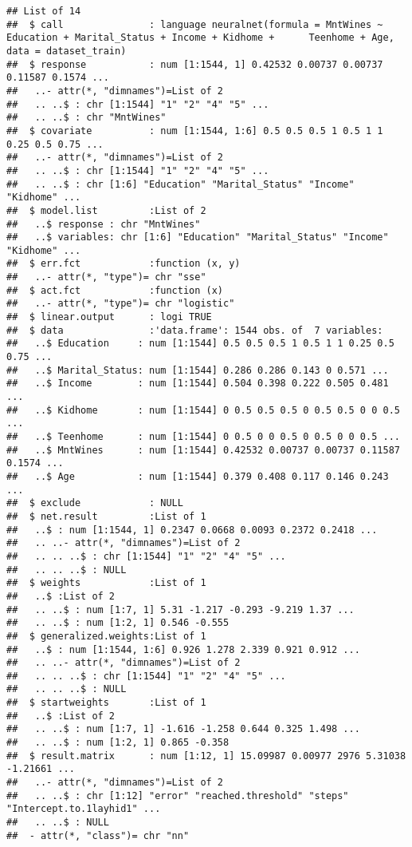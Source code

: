 \documentclass[Iberoamerican Journal of Industrial
Engineering,article,submit,moreauthors,pdftex]{Definitions/mdpi}
\begin{document}
\begin{verbatim}
## List of 14
##  $ call               : language neuralnet(formula = MntWines ~ Education + Marital_Status + Income + Kidhome +      Teenhome + Age, data = dataset_train)
##  $ response           : num [1:1544, 1] 0.42532 0.00737 0.00737 0.11587 0.1574 ...
##   ..- attr(*, "dimnames")=List of 2
##   .. ..$ : chr [1:1544] "1" "2" "4" "5" ...
##   .. ..$ : chr "MntWines"
##  $ covariate          : num [1:1544, 1:6] 0.5 0.5 0.5 1 0.5 1 1 0.25 0.5 0.75 ...
##   ..- attr(*, "dimnames")=List of 2
##   .. ..$ : chr [1:1544] "1" "2" "4" "5" ...
##   .. ..$ : chr [1:6] "Education" "Marital_Status" "Income" "Kidhome" ...
##  $ model.list         :List of 2
##   ..$ response : chr "MntWines"
##   ..$ variables: chr [1:6] "Education" "Marital_Status" "Income" "Kidhome" ...
##  $ err.fct            :function (x, y)  
##   ..- attr(*, "type")= chr "sse"
##  $ act.fct            :function (x)  
##   ..- attr(*, "type")= chr "logistic"
##  $ linear.output      : logi TRUE
##  $ data               :'data.frame': 1544 obs. of  7 variables:
##   ..$ Education     : num [1:1544] 0.5 0.5 0.5 1 0.5 1 1 0.25 0.5 0.75 ...
##   ..$ Marital_Status: num [1:1544] 0.286 0.286 0.143 0 0.571 ...
##   ..$ Income        : num [1:1544] 0.504 0.398 0.222 0.505 0.481 ...
##   ..$ Kidhome       : num [1:1544] 0 0.5 0.5 0.5 0 0.5 0.5 0 0 0.5 ...
##   ..$ Teenhome      : num [1:1544] 0 0.5 0 0 0.5 0 0.5 0 0 0.5 ...
##   ..$ MntWines      : num [1:1544] 0.42532 0.00737 0.00737 0.11587 0.1574 ...
##   ..$ Age           : num [1:1544] 0.379 0.408 0.117 0.146 0.243 ...
##  $ exclude            : NULL
##  $ net.result         :List of 1
##   ..$ : num [1:1544, 1] 0.2347 0.0668 0.0093 0.2372 0.2418 ...
##   .. ..- attr(*, "dimnames")=List of 2
##   .. .. ..$ : chr [1:1544] "1" "2" "4" "5" ...
##   .. .. ..$ : NULL
##  $ weights            :List of 1
##   ..$ :List of 2
##   .. ..$ : num [1:7, 1] 5.31 -1.217 -0.293 -9.219 1.37 ...
##   .. ..$ : num [1:2, 1] 0.546 -0.555
##  $ generalized.weights:List of 1
##   ..$ : num [1:1544, 1:6] 0.926 1.278 2.339 0.921 0.912 ...
##   .. ..- attr(*, "dimnames")=List of 2
##   .. .. ..$ : chr [1:1544] "1" "2" "4" "5" ...
##   .. .. ..$ : NULL
##  $ startweights       :List of 1
##   ..$ :List of 2
##   .. ..$ : num [1:7, 1] -1.616 -1.258 0.644 0.325 1.498 ...
##   .. ..$ : num [1:2, 1] 0.865 -0.358
##  $ result.matrix      : num [1:12, 1] 15.09987 0.00977 2976 5.31038 -1.21661 ...
##   ..- attr(*, "dimnames")=List of 2
##   .. ..$ : chr [1:12] "error" "reached.threshold" "steps" "Intercept.to.1layhid1" ...
##   .. ..$ : NULL
##  - attr(*, "class")= chr "nn"
\end{verbatim}
\end{document}
